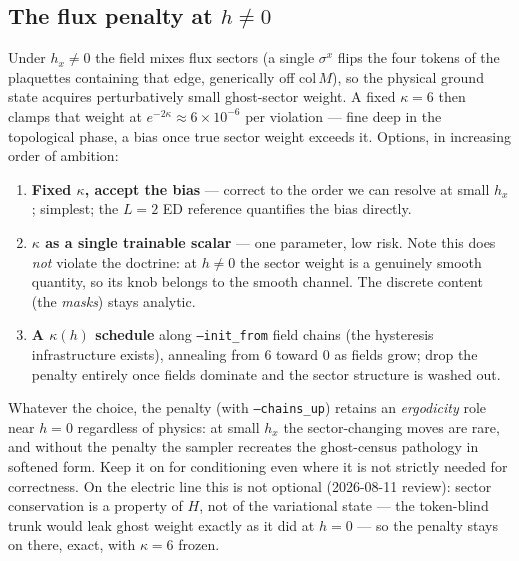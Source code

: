 \documentclass[11pt]{article}
\newcommand{\sx}{\sigma^x}
\begin{document}
\subsection{The flux penalty at $h\neq0$}
Under $h_x\neq0$ the field mixes flux sectors (a single $\sx$ flips the four
tokens of the plaquettes containing that edge, generically off
$\mathrm{col}\,M$), so the physical ground state acquires perturbatively
small ghost-sector weight. A fixed $\kappa=6$ then clamps that weight at
$e^{-2\kappa}\approx6\times10^{-6}$ per violation --- fine deep in the
topological phase, a bias once true sector weight exceeds it. Options, in
increasing order of ambition:
\begin{enumerate}
\item \textbf{Fixed $\kappa$, accept the bias} --- correct to the order we can
resolve at small $h_x$; simplest; the $L=2$ ED reference quantifies the bias
directly.
\item \textbf{$\kappa$ as a single trainable scalar} --- one parameter, low
risk. Note this does \emph{not} violate the doctrine: at $h\neq0$ the
sector weight is a genuinely smooth quantity, so its knob belongs to the
smooth channel. The discrete content (the \emph{masks}) stays analytic.
\item \textbf{A $\kappa(h)$ schedule} along \texttt{--init\_from} field
chains (the hysteresis infrastructure exists), annealing from 6 toward 0 as
fields grow; drop the penalty entirely once fields dominate and the sector
structure is washed out.
\end{enumerate}
Whatever the choice, the penalty (with \texttt{--chains\_up}) retains an
\emph{ergodicity} role near $h=0$ regardless of physics: at small $h_x$ the
sector-changing moves are rare, and without the penalty the sampler
recreates the ghost-census pathology in softened form. Keep it on for
conditioning even where it is not strictly needed for correctness. On the
electric line this is not optional (2026-08-11 review): sector conservation
is a property of $H$, not of the variational state --- the token-blind trunk
would leak ghost weight exactly as it did at $h=0$ --- so the penalty stays
on there, exact, with $\kappa=6$ frozen.
\end{document}
